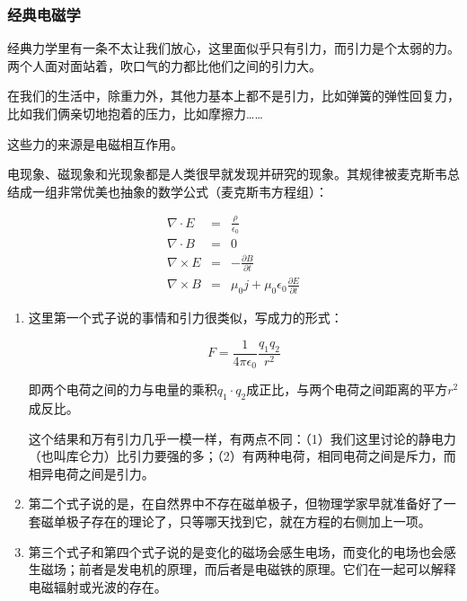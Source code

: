 \subsubsection{经典电磁学}

经典力学里有一条不太让我们放心，这里面似乎只有引力，而引力是个太弱的力。两个人面对面站着，吹口气的力都比他们之间的引力大。

在我们的生活中，除重力外，其他力基本上都不是引力，比如弹簧的弹性回复力，比如我们俩亲切地抱着的压力，比如摩擦力……

这些力的来源是电磁相互作用。

电现象、磁现象和光现象都是人类很早就发现并研究的现象。其规律被麦克斯韦总结成一组非常优美也抽象的数学公式（麦克斯韦方程组）：

\begin{eqnarray}
\nabla \cdot E & = & \frac{\rho}{ \epsilon_0}\\
\nabla \cdot B & = & 0 \\
\nabla \times E & = & - \frac{\partial B}{\partial t} \\
\nabla \times B & = & \mu_0 j + \mu_0 \epsilon_0 \frac{\partial E}{\partial t}
\end{eqnarray}

\begin{enumerate}
\item 

这里第一个式子说的事情和引力很类似，写成力的形式：

\begin{equation}
F = \frac{1}{4 \pi \epsilon_0} \frac{q_1 q_2}{r^2}
\end{equation}

即两个电荷之间的力与电量的乘积$q_1 \cdot q_2$成正比，与两个电荷之间距离的平方$r^2$成反比。

这个结果和万有引力几乎一模一样，有两点不同：（1）我们这里讨论的静电力（也叫库仑力）比引力要强的多；（2）有两种电荷，相同电荷之间是斥力，而相异电荷之间是引力。

\item

第二个式子说的是，在自然界中不存在磁单极子，但物理学家早就准备好了一套磁单极子存在的理论了，只等哪天找到它，就在方程的右侧加上一项。

\item

第三个式子和第四个式子说的是变化的磁场会感生电场，而变化的电场也会感生磁场；前者是发电机的原理，而后者是电磁铁的原理。它们在一起可以解释电磁辐射或光波的存在。

\end{enumerate}

